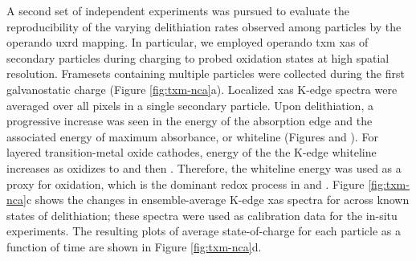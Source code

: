 \documentclass{article}
\begin{document}


A second set of independent experiments was pursued to evaluate the
reproducibility of the varying delithiation rates observed among
particles by the operando \gls{uxrd} mapping. In particular, we
employed operando \Gls{txm} \gls{xas} of \nca{} secondary particles
during charging to probed  oxidation states at high spatial
resolution. Framesets containing multiple particles were collected
during the first galvanostatic charge (Figure
\ref{fig:txm-nca}a). Localized \gls{xas} K-edge spectra were averaged
over all pixels in a single secondary particle. Upon delithiation, a
progressive increase was seen in the energy of the absorption edge and
the associated energy of maximum absorbance, or whiteline (Figures
 and ). For layered
transition-metal oxide cathodes, energy of the the  K-edge
whiteline increases as  oxidizes to  and then
. Therefore, the whiteline energy was used as a proxy for
 oxidation, which is the dominant redox process in \nca{} and
\nmc{}. Figure \ref{fig:txm-nca}c shows the changes in
ensemble-average  K-edge \gls{xas} spectra for \nca{} across
known states of delithiation; these spectra were used as calibration
data for the in-situ experiments. The resulting plots of average
state-of-charge for each particle as a function of time are shown in
Figure \ref{fig:txm-nca}d.
\end{document}
